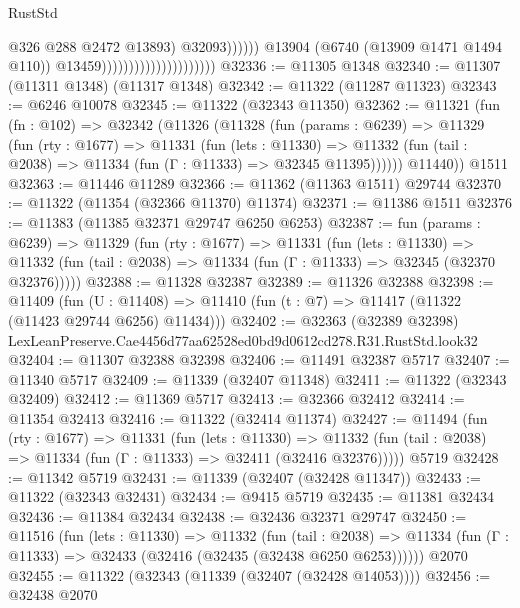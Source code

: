 \begin{lexlean}{RustStd}
\begin{coremodule}
                                                            @326
                                                            @288
                                                            @2472
                                                            @13893)
                                                          @32093))))))
                                              @13904
                                              (@6740 (@13909 @1471 @1494 @110))
                                              @13459)))))))))))))))))))))
@32336 := @11305 @1348
@32340 := @11307 (@11311 @1348) (@11317 @1348)
@32342 := @11322 (@11287 @11323)
@32343 := @6246 @10078
@32345 := @11322 (@32343 @11350)
@32362 := @11321
    (fun (fn : @102) =>
    @32342
      (@11326
        (@11328
          (fun (params : @6239) =>
          @11329
            (fun (rty : @1677) =>
            @11331
              (fun (lets : @11330) =>
              @11332 (fun (tail : @2038) => @11334 (fun (Γ : @11333) => @32345 @11395))))))
        @11440))
    @1511
@32363 := @11446 @11289
@32366 := @11362 (@11363 @1511) @29744
@32370 := @11322 (@11354 (@32366 @11370) @11374)
@32371 := @11386 @1511
@32376 := @11383 (@11385 @32371 @29747 @6250 @6253)
@32387 := fun (params : @6239) =>
  @11329
    (fun (rty : @1677) =>
    @11331
      (fun (lets : @11330) =>
      @11332 (fun (tail : @2038) => @11334 (fun (Γ : @11333) => @32345 (@32370 @32376)))))
@32388 := @11328 @32387
@32389 := @11326 @32388
@32398 := @11409
    (fun (U : @11408) => @11410 (fun (t : @7) => @11417 (@11322 (@11423 @29744 @6256) @11434)))
@32402 := @32363
    (@32389 @32398)
    LexLeanPreserve.Cae4456d77aa62528ed0bd9d0612cd278.R31.RustStd.look32
@32404 := @11307 @32388 @32398
@32406 := @11491 @32387 @5717
@32407 := @11340 @5717
@32409 := @11339 (@32407 @11348)
@32411 := @11322 (@32343 @32409)
@32412 := @11369 @5717
@32413 := @32366 @32412
@32414 := @11354 @32413
@32416 := @11322 (@32414 @11374)
@32427 := @11494
    (fun (rty : @1677) =>
    @11331
      (fun (lets : @11330) =>
      @11332 (fun (tail : @2038) => @11334 (fun (Γ : @11333) => @32411 (@32416 @32376)))))
    @5719
@32428 := @11342 @5719
@32431 := @11339 (@32407 (@32428 @11347))
@32433 := @11322 (@32343 @32431)
@32434 := @9415 @5719
@32435 := @11381 @32434
@32436 := @11384 @32434
@32438 := @32436 @32371 @29747
@32450 := @11516
    (fun (lets : @11330) =>
    @11332
      (fun (tail : @2038) =>
      @11334 (fun (Γ : @11333) => @32433 (@32416 (@32435 (@32438 @6250 @6253))))))
    @2070
@32455 := @11322 (@32343 (@11339 (@32407 (@32428 @14053))))
@32456 := @32438 @2070

\end{coremodule}
\end{lexlean}
